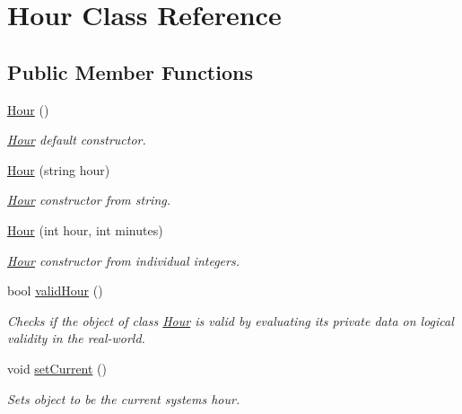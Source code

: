 \hypertarget{class_hour}{}\section{Hour Class Reference}
\label{class_hour}
\subsection*{Public Member Functions}
\begin{DoxyCompactItemize}
\item 
\hyperlink{group___hour_ga57b604e71195671d96ef6b8e7b819a71}{Hour} ()
\begin{DoxyCompactList}\small\item\em \hyperlink{class_hour}{Hour} default constructor. \end{DoxyCompactList}\item 
\hyperlink{group___hour_ga77024d0dee349bc56162428af7c60f8c}{Hour} (string hour)
\begin{DoxyCompactList}\small\item\em \hyperlink{class_hour}{Hour} constructor from string. \end{DoxyCompactList}\item 
\hyperlink{group___hour_gaedd062589c21da403d9490a9706c3005}{Hour} (int hour, int minutes)
\begin{DoxyCompactList}\small\item\em \hyperlink{class_hour}{Hour} constructor from individual integers. \end{DoxyCompactList}\item 
bool \hyperlink{group___hour_ga1643bbcd2a1b14cd49f45955c62e8ce1}{valid\+Hour} ()
\begin{DoxyCompactList}\small\item\em Checks if the object of class \hyperlink{class_hour}{Hour} is valid by evaluating it\textquotesingle{}s private data on logical validity in the real-\/world. \end{DoxyCompactList}\item 
void \hyperlink{group___hour_ga641c0cf6dd5156a61d5f7f829891b42f}{set\+Current} ()
\begin{DoxyCompactList}\small\item\em Sets object to be the current system\textquotesingle{}s hour. \end{DoxyCompactList}\end{DoxyCompactItemize}
